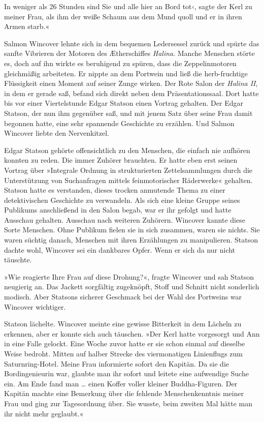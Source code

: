 In weniger als 26 Stunden sind Sie und alle hier an Bord tot‹,
sagte der Kerl zu meiner Frau, als ihm der weiße Schaum aus dem
Mund quoll und er in ihren Armen starb.«

\bigpar

Salmon Wincover lehnte sich in dem bequemen Ledersessel zurück und
spürte das sanfte Vibrieren der Motoren des Ætherschiffes \textit{Halina}.
Manche Menschen störte es, doch auf ihn wirkte es beruhigend zu
spüren, dass die Zeppelinmotoren gleichmäßig arbeiteten. Er nippte
an dem Portwein und ließ die herb-fruchtige Flüssigkeit einen
Moment auf seiner Zunge wirken. Der Rote Salon der \textit{Halina II}, in
dem er gerade saß, befand sich direkt neben dem Präsentationssaal.
Dort hatte bis vor einer Viertelstunde Edgar Statson einen Vortrag
gehalten. Der Edgar Statson, der nun ihm gegenüber saß, und mit
jenem Satz über seine Frau damit begonnen hatte, eine sehr
spannende Geschichte zu erzählen. Und Salmon Wincover liebte den
Nervenkitzel.

Edgar Statson gehörte offensichtlich zu den Menschen, die einfach
nie aufhören konnten zu reden. Die immer Zuhörer brauchten. Er
hatte eben erst seinen Vortrag über »Integrale Ordnung in
strukturierten Zettelsammlungen durch die Unterstützung von
Suchanfragen mittels feinmotorischer Räderwerke« gehalten. Statson
hatte es verstanden, dieses trocken anmutende Thema zu einer
detektivischen Geschichte zu verwandeln. Als sich eine kleine
Gruppe seines Publikums anschließend in den Salon begab, war er ihr
gefolgt und hatte Ausschau gehalten. Ausschau nach weiteren
Zuhörern. Wincover kannte diese Sorte Menschen. Ohne Publikum
fielen sie in sich zusammen, waren sie nichts. Sie waren süchtig
danach, Menschen mit ihren Erzählungen zu manipulieren. Statson
dachte wohl, Wincover sei ein dankbares Opfer. Wenn er sich da nur
nicht täuschte.

»Wie reagierte Ihre Frau auf diese Drohung?«, fragte Wincover und
sah Statson neugierig an. Das Jackett sorgfältig zugeknöpft, Stoff
und Schnitt nicht sonderlich modisch. Aber Statsons sicherer
Geschmack bei der Wahl des Portweins war Wincover wichtiger.

Statson lächelte. Wincover meinte eine gewisse Bitterkeit in dem
Lächeln zu erkennen, aber er konnte sich auch täuschen. »Der Kerl
hatte vorgesorgt und Ann in eine Falle gelockt. Eine Woche zuvor
hatte er sie schon einmal auf dieselbe Weise bedroht. Mitten auf
halber Strecke des viermonatigen Linienflugs zum Saturnring-Hotel.
Meine Frau informierte sofort den Kapitän. Da sie die
Bordingenieurin war, glaubte man ihr sofort und leitete eine
aufwendige Suche ein. Am Ende fand man \ldots{} einen Koffer voller
kleiner Buddha-Figuren. Der Kapitän machte eine Bemerkung über die
fehlende Menschenkenntnis meiner Frau und ging zur Tagesordnung
über. Sie wusste, beim zweiten Mal hätte man ihr nicht mehr
geglaubt.«

